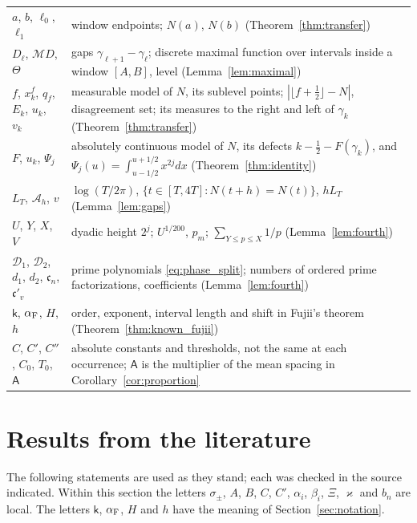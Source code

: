 \documentclass[11pt,a4paper]{article}
\makeatletter
\numberwithin{equation}{section}
\DeclareRobustCommand{\CGref}[1]{\ref{#1}}
\DeclareRobustCommand{\CGeqref}[1]{\eqref{#1}}
\let\CG@origref\ref
\let\CG@origeqref\eqref
\newcommand{\CG@gettip}[1]{\@ifundefined{CGTip@#1}{#1}{\csname CGTip@#1\endcsname}}
\DeclareRobustCommand{\CGref}[1]{\pdftooltip{\CG@origref{#1}}{\CG@gettip{#1}}}
\DeclareRobustCommand{\CGeqref}[1]{\pdftooltip{\CG@origeqref{#1}}{\CG@gettip{#1}}}
\theoremstyle{definition}
\theoremstyle{remark}
\newcommand{\M}{\mathcal M}
\makeatother
\begin{document}
\begin{center}
\begin{longtable}{p{}p{}}
$a$, $b$, $\ell_0$, $\ell_1$ & window endpoints; $N(a)$, $N(b)$ (Theorem~\CGref{thm:transfer})\\
$D_\ell$, $\M D$, $\Theta$ & gaps $\gamma_{\ell+1}-\gamma_\ell$; discrete maximal function over intervals inside a window $[A,B]$, level (Lemma~\CGref{lem:maximal})\\
$f$, $x^f_k$, $q_f$, $E_k$, $u_k$, $v_k$ & measurable model of $N$, its sublevel points; $|\lfloor f+\frac12\rfloor-N|$, disagreement set; its measures to the right and left of $\gamma_k$ (Theorem~\CGref{thm:transfer})\\
$F$, $u_k$, $\Psi_j$ & absolutely continuous model of $N$, its defects $k-\frac12-F(\gamma_k)$, and $\Psi_j(u)=\int_{u-1/2}^{u+1/2}x^{2j}dx$ (Theorem~\CGref{thm:identity})\\
$L_T$, $\mathcal A_h$, $v$ & $\log(T/2\pi)$, $\{t\in[T,4T]:N(t+h)=N(t)\}$, $hL_T$ (Lemma~\CGref{lem:gaps})\\
$U$, $Y$, $X$, $V$ & dyadic height $2^j$; $U^{1/200}$, $p_m$; $\sum_{Y\le p\le X}1/p$ (Lemma~\CGref{lem:fourth})\\
$\mathscr D_1$, $\mathscr D_2$, $d_1$, $d_2$, $\mathfrak c_n$, $\mathfrak c'_v$ & prime polynomials \CGeqref{eq:phase_split}; numbers of ordered prime factorizations, coefficients (Lemma~\CGref{lem:fourth})\\
$\mathsf k$, $\alpha_{\rm F}$, $H$, $h$ & order, exponent, interval length and shift in Fujii's theorem (Theorem~\CGref{thm:known_fujii})\\
$C$, $C'$, $C''$, $C_0$, $T_0$, $\mathsf A$ & absolute constants and thresholds, not the same at each occurrence; $\mathsf A$ is the multiplier of the mean spacing in Corollary~\CGref{cor:proportion}\\
\end{longtable}
\end{center}

\section{Results from the literature}\label{sec:external}

The following statements are used as they stand; each was checked in the source indicated. Within this section the letters $\sigma_\pm$, $A$, $B$, $C$, $C'$, $\alpha_i$, $\beta_i$, $\Xi$, $\varkappa$ and $b_n$ are local. The letters $\mathsf k$, $\alpha_{\rm F}$, $H$ and $h$ have the meaning of Section~\CGref{sec:notation}.
\end{document}
